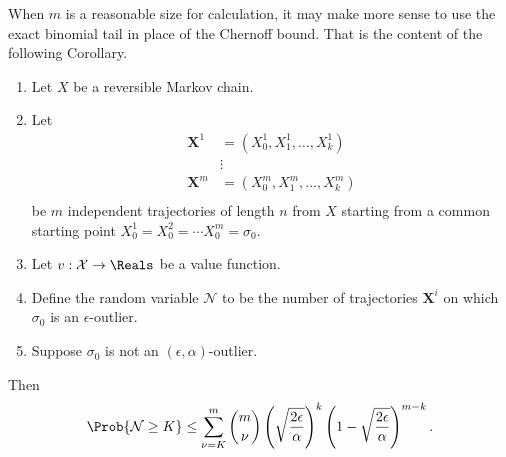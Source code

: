 \documentclass[12pt]{article}
\begin{document}
\begin{remark}
    When \( m \) is a reasonable size for calculation, it may make more
    sense to use the exact binomial tail in place of the Chernoff bound.
    That is the content of the following Corollary.
\end{remark}

\begin{corollary}
    \begin{enumerate}
        \item
            Let \( X \) be a reversible Markov chain.
        \item
            Let
            \begin{align*}
                \mathbf{X}^1 &= (X_0^1, X_1^1, \dots, X_k^1 )\\
                &\vdots \\
                \mathbf{X}^m &= (X_0^m, X_1^m, \dots, X_k^m )\\
            \end{align*}
            be \( m \) independent trajectories of length \( n \) from \(
            X \) starting from a common starting point \( X_0^1 = X_0^2
            = \cdots X_0^m = \sigma_0 \).
        \item
            Let \( v :  \mathcal{X} \to \Reals \) be a value function.
        \item
            Define the random variable \( \mathcal{N} \) to be the
            number of trajectories \( \mathbf{X}^i \) on which \( \sigma_0
            \) is an \( \epsilon \)-outlier.
        \item
            Suppose \( \sigma_0 \) is not an \( (\epsilon, \alpha) \)-outlier.
    \end{enumerate}
    Then
    \[
        \Prob{\mathcal{N} \ge K} \le \sum\limits_ {\nu=K}^m \binom{m}{\nu}
        \left( \sqrt{\frac{2\epsilon} {\alpha}} \right)^k \left( 1 - \sqrt{\frac
        {2\epsilon}{\alpha}} \right)^ {m-k}.
    \]
\end{corollary}
\end{document}

